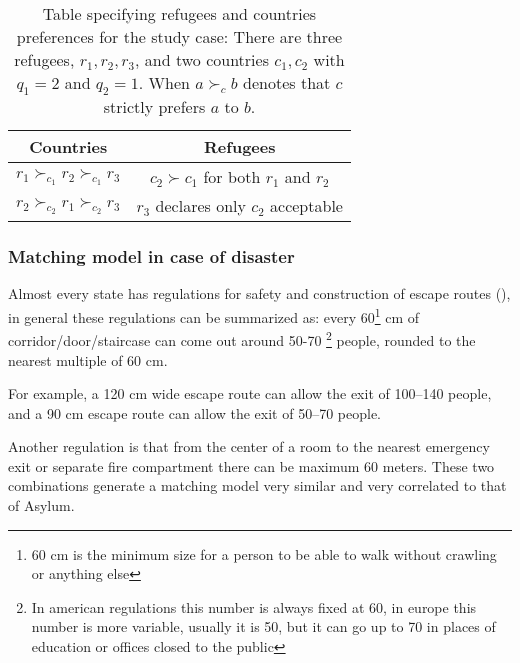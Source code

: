 \documentclass[letterpaper]{article} %
\begin{document}
    \begin{table}[!htb]
        \begin{tabular}{c|c}
            \hline Countries                                          & Refugees                                                   \\
            \hline\( r_{1} \succ_{c_{1}} r_{2} \succ_{c_{1}} r_{3} \) & \( c_{2} \succ c_{1} \) for both \( r_{1} \) and \( r_{2} \) \\
            \( r_{2} \succ_{c_{2}} r_{1} \succ_{c_{2}} r_{3} \)       & \( r_{3} \) declares only \( c_{2} \) acceptable           \\
            \hline
        \end{tabular}
        \caption{Table specifying refugees and countries preferences for
        the study case: There are three refugees, \( r _ { 1 } , r _ { 2 } , r _ { 3 } \), and two countries \( c _ { 1 } , c _ { 2 } \) with \( q _ { 1 } = 2 \) and \( q _ { 2 } = 1 \).
        When \( a \succ_{c} b \) denotes that \( c \) strictly prefers \( a \) to \( b \).}
        \label{tab:countries-refugees}
    \end{table}

    \subsubsection{Matching model in case of disaster}\label{matching-model-in-case-of-disaster}%
    Almost every state has regulations for safety and construction of escape routes
    (\citet{it-81-2008,uk-1541-2005,usa-1910-1974,cee-654-1989,cee-567-1977}), in general these
    regulations can be summarized as: every 60\footnote{60 cm is the minimum size for a person to be
    able to walk without crawling or anything else} cm of corridor/door/staircase can come out around 50-70
    \footnote{In american regulations this number is always fixed at 60, in europe this number is more
    variable, usually it is 50, but it can go up to 70 in places of education or offices closed to the public}
    people, rounded to the nearest multiple of 60 cm.

    For example, a 120 cm wide escape route can allow the exit of 100--140 people, and a 90 cm
    escape route can allow the exit of 50--70 people.

    Another regulation is that from the center of a room to the nearest emergency exit or separate
    fire compartment there can be maximum 60 meters.
    These two combinations generate a matching model
    very similar and very correlated to that of Asylum.
\end{document}
